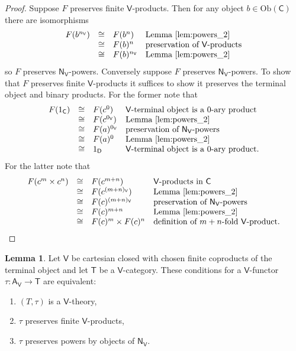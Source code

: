 \documentclass{amsart}
\theoremstyle{definition}
\newtheorem{lemma}[theorem]{Lemma}
\newcommand{\NN}{\mathsf{N}}
\newcommand{\A}{\mathsf{A}}
\newcommand{\V}{\mathsf{V}}
\newcommand{\D}{\mathsf{D}}
\newcommand{\C}{\mathsf{C}}
\newcommand{\T}{\mathsf{T}}
\newcommand{\Obj}{\mathrm{Ob}}
\newcommand{\maps}{\colon}
\begin{document}
\begin{proof}
Suppose $F$ preserves finite $\V$-products.  Then for any object $b \in \Obj(\C)$
there are isomorphisms
\[\begin{array}{rcll}
F(b^{n_\V}) & \cong & F(b^n) & \text{Lemma \ref{lem:powers_2}} \\
 & \cong & F(b)^n & \text{preservation of $\V$-products} \\
 & \cong & F(b)^{n_\V} &  \text{Lemma \ref{lem:powers_2}}
\end{array}
\]
so $F$ preserves  $\NN_\V$-powers.  Conversely suppose $F$ preserves $\NN_\V$-powers.
To show that $F$ preserves finite $\V$-products it suffices to show it preserves
the terminal object and binary products.   For the former note that
\[\begin{array}{rcll}
F(1_\C) & \cong & F(c^0) & \text{$\V$-terminal object is a 0-ary product} \\
 & \cong & F(c^{0_\V}) & \text{Lemma \ref{lem:powers_2}} \\
 & \cong & F(a)^{0_\V} & \text{preservation of $\NN_\V$-powers} \\
 & \cong & F(a)^0 &  \text{Lemma \ref{lem:powers_2}} \\
 & \cong & 1_\D & \text{$\V$-terminal object is a 0-ary product.}
\end{array}
\]
For the latter note that
\[\begin{array}{rcll}
F(c^m \times c^n) & \cong & F(c^{m+n}) & \text{$\V$-products in $\C$} \\
 & \cong & F(c^{(m+n)_\V}) & \text{Lemma \ref{lem:powers_2}} \\
 & \cong & F(c)^{(m+n)_\V} & \text{preservation of $\NN_\V$-powers} \\
 & \cong & F(c)^{m+n} &  \text{Lemma \ref{lem:powers_2}} \\
 & \cong & F(c)^m \times F(c)^n & \text{definition of $m+n$-fold $\V$-product.}
\end{array}  
\]
\end{proof}

\begin{lemma}
\label{lem:powers_4}
Let $\V$ be cartesian closed with chosen finite coproducts of the terminal object and let
$\T$ be a $\V$-category.  These conditions for a $\V$-functor $\tau \maps \A_\V \to \T$ are equivalent:
\begin{enumerate}
\item $(T,\tau)$ is a $\V$-theory,
\item $\tau$ preserves finite $\V$-products,
\item $\tau$ preserves powers by objects of $\NN_\V$.
\end{enumerate}
\end{lemma}
\end{document}
